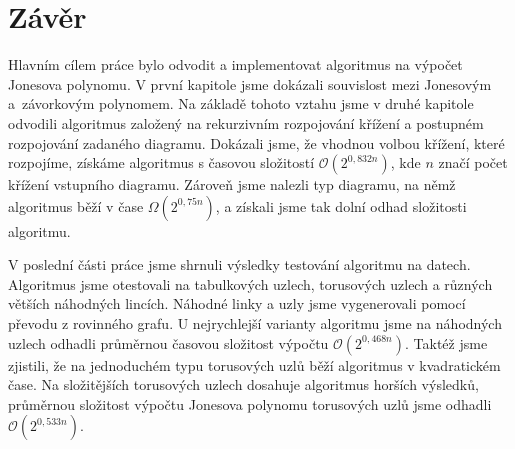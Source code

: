 \chapter*{Závěr}

Hlavním cílem práce bylo odvodit a implementovat algoritmus na výpočet Jonesova polynomu. V první kapitole jsme dokázali souvislost mezi Jonesovým a~závorkovým polynomem.  Na základě tohoto vztahu jsme v druhé kapitole odvodili algoritmus založený na rekurzivním rozpojování křížení a postupném rozpojování zadaného diagramu. Dokázali jsme, že vhodnou volbou křížení, které rozpojíme, získáme algoritmus s časovou složitostí $\mathcal{O}(2^{0,832n})$, kde $n$ značí počet křížení vstupního diagramu. Zároveň jsme nalezli typ diagramu, na němž algoritmus běží v čase $\Omega (2^{0,75n})$, a získali jsme tak dolní odhad složitosti algoritmu.

V poslední části práce jsme shrnuli výsledky testování algoritmu na datech. Algoritmus jsme otestovali na tabulkových uzlech, torusových uzlech a různých větších náhodných lincích. Náhodné linky a uzly jsme vygenerovali pomocí převodu z rovinného grafu. U nejrychlejší varianty algoritmu  jsme na náhodných uzlech odhadli průměrnou časovou složitost výpočtu $\mathcal{O}(2^{0,468n})$. Taktéž jsme zjistili, že na jednoduchém typu torusových uzlů běží algoritmus v kvadratickém čase. Na složitějších torusových uzlech dosahuje algoritmus horších výsledků, průměrnou složitost výpočtu Jonesova polynomu torusových uzlů jsme odhadli $\mathcal{O}(2^{0,533n})$.
